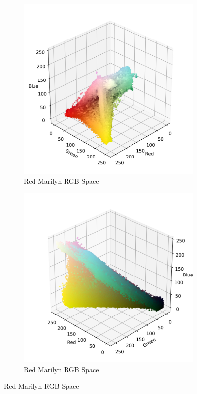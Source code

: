 \documentclass{article}
\begin{document}
\begin{figure}[ht]
  \centering
  \begin{subfigure}{0.45\textwidth}
    \includegraphics[width=\textwidth]{main_files/figure-latex/4_5_red_marilyn_original_scatter.jpg}
    \caption{Red Marilyn RGB Space}
    \label{fig:4_5_red_marilyn_original_scatter}
  \end{subfigure}
  \hfill
  \begin{subfigure}{0.45\textwidth}
    \includegraphics[width=\textwidth]{main_files/figure-latex/4_6_red_marilyn_original_scatter.jpg}
    \caption{Red Marilyn RGB Space}
    \label{fig:4_6_red_marilyn_original_scatter}
  \end{subfigure}
  \label{fig:red_marilyn_original_scatter_1}
\end{figure}
\end{document}
